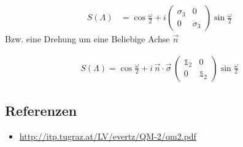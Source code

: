 \begin{align}
  \label{eq:46}
   S(\Lambda)&= \cos\frac{\omega}{2}+i  \begin{pmatrix}\sigma_3&0\\0&\sigma_3\end{pmatrix}\sin\frac{\omega}{2}
\end{align}
Bzw. eine Drehung um eine Beliebige Achse \(\vec n\)

\begin{align}
  \label{eq:47}
   \boxed{S(\Lambda) = \cos\frac{\omega}{2}+i\, \vec n\cdot\vec\sigma\,\begin{pmatrix}\mathds 1_2&0\\0&\mathds 1_2\end{pmatrix}\sin\frac{\omega}{2}}
\end{align}

\subsection*{Referenzen}
\begin{itemize}
\item \url{ http://itp.tugraz.at/LV/evertz/QM-2/qm2.pdf }
\end{itemize}


